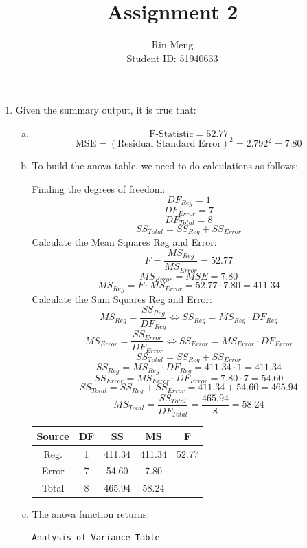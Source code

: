 \documentclass[12pt]{article}
\title{Assignment 2}
\author{Rin Meng \\ Student ID: 51940633}
\begin{document}
\maketitle

\begin{enumerate}[1.]
    \item Given the summary output, it is true that:
    \begin{enumerate}[(a)]
        \item \[\text{F-Statistic} = 52.77\]
        \[\text{MSE} = (\text{Residual Standard Error})^2 = 2.792^2 =  7.80\]
        \item To build the anova table, we need to do calculations as follows:
        
            Finding the degrees of freedom:
            \[ DF_{Reg} = 1 \]
            \[ DF_{Error} = 7 \]
            \[ DF_{Total} = 8 \]
            \[ SS_{Total} = SS_{Reg} + SS_{Error}\]
            Calculate the Mean Squares Reg and Error:
            \[ F = \frac{MS_{Reg}}{MS_{Error}} = 52.77\]
            \[ MS_{Error} = MSE = 7.80\]
            \[ MS_{Reg} = F \cdot MS_{Error} = 52.77 \cdot 7.80 = 411.34\]
            Calculate the Sum Squares Reg and Error:
            \[ MS_{Reg} = \frac{SS_{Reg}}{DF_{Reg}} \Leftrightarrow SS_{Reg} = MS_{Reg} \cdot DF_{Reg}\]
            \[ MS_{Error} = \frac{SS_{Error}}{DF_{Error}} \Leftrightarrow SS_{Error} = MS_{Error} \cdot DF_{Error}\]
            \[ SS_{Total} = SS_{Reg} + SS_{Error}\]
            \[ SS_{Reg} = MS_{Reg} \cdot DF_{Reg} = 411.34 \cdot 1 = 411.34\]
            \[ SS_{Error} = MS_{Error} \cdot DF_{Error}= 7.80 \cdot 7 = 54.60 \]
            \[ SS_{Total} = SS_{Reg} + SS_{Error} = 411.34 + 54.60 = 465.94\]
            \[ MS_{Total} = \frac{SS_{Total}}{DF_{Total}} = \frac{465.94}{8} = 58.24 \]
            \begin{center}
                \begin{tabular}{|c|c|c|c|c|}
                    \hline
                    Source & DF & SS & MS & F \\
                    \hline
                    Reg. & 1 & 411.34 & 411.34 & 52.77 \\
                    Error & 7 & 54.60 & 7.80 &  \\
                    Total & 8 & 465.94 & 58.24 & \\
                    \hline
                \end{tabular}
            \end{center}
        \item The anova function returns:
            \begin{verbatim}
Analysis of Variance Table


\end{verbatim}
\end{enumerate}
\end{enumerate}
\end{document}
